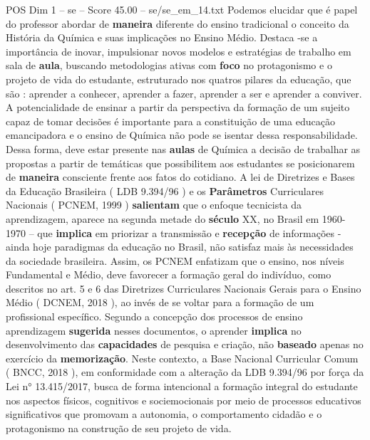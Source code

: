 \begin{textsample}{POS Dim 1 – se – Score 45.00 – se/se\_em\_14.txt}
Podemos elucidar que é papel do professor abordar de \textbf{maneira} diferente do ensino tradicional o conceito da História da Química e suas implicações no Ensino Médio.
Destaca -se a importância de inovar, impulsionar novos modelos e estratégias de trabalho em sala de \textbf{aula}, buscando metodologias ativas com \textbf{foco} no protagonismo e o projeto de vida do estudante, estruturado nos quatros pilares da educação, que são : aprender a conhecer, aprender a fazer, aprender a ser e aprender a conviver.
A potencialidade de ensinar a partir da perspectiva da formação de um sujeito capaz de tomar decisões é importante para a constituição de uma educação emancipadora e o ensino de Química não pode se isentar dessa responsabilidade.
Dessa forma, deve estar presente nas \textbf{aulas} de Química a decisão de trabalhar as propostas a partir de temáticas que possibilitem aos estudantes se posicionarem de \textbf{maneira} consciente frente aos fatos do cotidiano.
A lei de Diretrizes e Bases da Educação Brasileira ( LDB 9.394/96 ) e os \textbf{Parâmetros} Curriculares Nacionais ( PCNEM, 1999 ) \textbf{salientam} que o enfoque tecnicista da aprendizagem, aparece na segunda metade do \textbf{século} XX, no Brasil em 1960-1970 – que \textbf{implica} em priorizar a transmissão e \textbf{recepção} de informações - ainda hoje paradigmas da educação no Brasil, não satisfaz mais às necessidades da sociedade brasileira.
Assim, os PCNEM enfatizam que o ensino, nos níveis Fundamental e Médio, deve favorecer a formação geral do indivíduo, como descritos no art. 5 e 6 das Diretrizes Curriculares Nacionais Gerais para o Ensino Médio ( DCNEM, 2018 ), ao invés de se voltar para a formação de um profissional específico.
Segundo a concepção dos processos de ensino aprendizagem \textbf{sugerida} nesses documentos, o aprender \textbf{implica} no desenvolvimento das \textbf{capacidades} de pesquisa e criação, não \textbf{baseado} apenas no exercício da \textbf{memorização}.
Neste contexto, a Base Nacional Curricular Comum ( BNCC, 2018 ), em conformidade com a alteração da LDB 9.394/96 por força da Lei n{\EmojiFont °} 13.415/2017, busca de forma intencional a formação integral do estudante nos aspectos físicos, cognitivos e sociemocionais por meio de processos educativos significativos que promovam a autonomia, o comportamento cidadão e o protagonismo na construção de seu projeto de vida.

\end{textsample}
